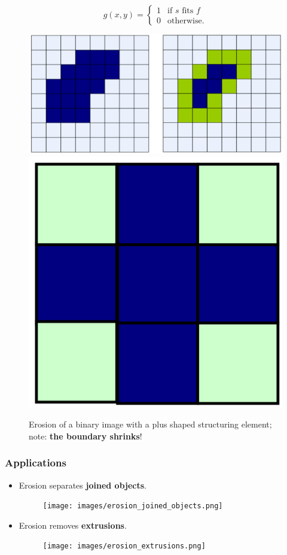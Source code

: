 \begin{equation*}
  g(x, y) =
  \begin{cases}
    1 & \text{if } s \text{ fits } f\\
    0 & \text{otherwise}.
  \end{cases}
\end{equation*}

\begin{figure}[H]
  \centering
  \includegraphics[width=\linewidth]{images/erosion.png}
  \includegraphics[width=0.18\linewidth]{images/erosion_structuring_element.png}
  \caption{Erosion of a binary image with a plus shaped structuring
  element; note: \textbf{the boundary shrinks}!}
\end{figure}

\subsubsection*{Applications}

\begin{itemize}
  \item Erosion separates \textbf{joined objects}.

    \begin{minipage}{\linewidth}
      \begin{figure}[H]
        \centering
        \texttt{[image: images/erosion\_joined\_objects.png]}
      \end{figure}
    \end{minipage}

  \item Erosion removes \textbf{extrusions}.

    \begin{minipage}{\linewidth}
      \begin{figure}[H]
        \centering
        \texttt{[image: images/erosion\_extrusions.png]}
      \end{figure}
    \end{minipage}
\end{itemize}

